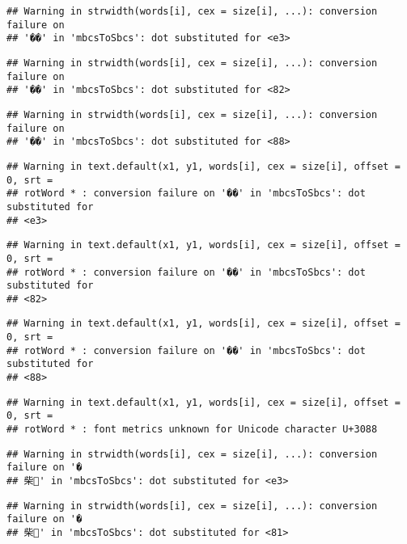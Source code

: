 \documentclass[]{article}
\begin{document}
\begin{verbatim}
## Warning in strwidth(words[i], cex = size[i], ...): conversion failure on
## '��' in 'mbcsToSbcs': dot substituted for <e3>
\end{verbatim}

\begin{verbatim}
## Warning in strwidth(words[i], cex = size[i], ...): conversion failure on
## '��' in 'mbcsToSbcs': dot substituted for <82>
\end{verbatim}

\begin{verbatim}
## Warning in strwidth(words[i], cex = size[i], ...): conversion failure on
## '��' in 'mbcsToSbcs': dot substituted for <88>
\end{verbatim}

\begin{verbatim}
## Warning in text.default(x1, y1, words[i], cex = size[i], offset = 0, srt =
## rotWord * : conversion failure on '��' in 'mbcsToSbcs': dot substituted for
## <e3>
\end{verbatim}

\begin{verbatim}
## Warning in text.default(x1, y1, words[i], cex = size[i], offset = 0, srt =
## rotWord * : conversion failure on '��' in 'mbcsToSbcs': dot substituted for
## <82>
\end{verbatim}

\begin{verbatim}
## Warning in text.default(x1, y1, words[i], cex = size[i], offset = 0, srt =
## rotWord * : conversion failure on '��' in 'mbcsToSbcs': dot substituted for
## <88>
\end{verbatim}

\begin{verbatim}
## Warning in text.default(x1, y1, words[i], cex = size[i], offset = 0, srt =
## rotWord * : font metrics unknown for Unicode character U+3088
\end{verbatim}

\begin{verbatim}
## Warning in strwidth(words[i], cex = size[i], ...): conversion failure on '�
## 柴' in 'mbcsToSbcs': dot substituted for <e3>
\end{verbatim}

\begin{verbatim}
## Warning in strwidth(words[i], cex = size[i], ...): conversion failure on '�
## 柴' in 'mbcsToSbcs': dot substituted for <81>
\end{verbatim}
\end{document}
